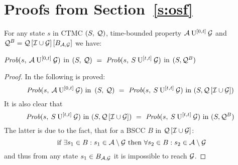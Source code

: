 \documentclass{entcs}
\newcommand{\Section}[1]{\section{#1}}
\begin{document}
	\Section{ Proofs from Section~\ref{s:osf} \label{app:osf}}

		\begin{proposition}
		For any state $s$ in CTMC $\left( S,\: \mathcal{Q} \right)$, time-bounded property $\mathcal{A} \: \mathrm{U}^{[0,t]} \: \mathcal{G}$ and $\mathcal{Q}^{B} = \mathcal{Q}\left[ \mathcal{I} \cup \mathcal{G} \right] \left[ B_{ \mathcal{A}, \mathcal{G} } \right]$ we have:
			\begin{center}
				$\mbox{\it Prob}(s, \: \mathcal{A} \: \mathrm{U}^{[0,t]} \: \mathcal{G} )$ in $\left( S,\: \mathcal{Q} \right) \ = \ \mbox{\it Prob}(s, \: S \: \mathrm{U}^{[t,t]} \: \mathcal{G} )$ in $(S,\mathcal{Q}^{B})$
			\end{center}
		\end{proposition}
		{\small
			\begin{proof}
				In \cite{BaierHHK_TSE03} the following is proved:
					\[
						\PsaUg{s}{0}{t}\text{ in }\CTMC \ = \ \PsSUg{s}{t}{t}\text{ in }(S,\mQnavg)
					\]
				It is also clear that
					\[
						\PsSUg{s}{t}{t}\text{ in }(S,\mQnavg) \ = \ \PsSUg{s}{t}{t}\text{ in }(S,\mQB)
					\]
				The latter is due to the fact, that for a BSCC $B$ in $\mathcal{Q}\left[ \mathcal{I} \cup \mathcal{G} \right]$:
					\[
						\text{ if } \exists s_{1} \in B : s_{1} \in \mathcal{A} \setminus \mathcal{G} \text{ then } \forall s_{2} \in B : s_{2} \in \mathcal{A} \setminus \mathcal{G}
					\]
				and thus from any state $s_{1} \in B_{ \mathcal{A}, \mathcal{G} }$ it is impossible to reach $\mathcal{G}$.
			\end{proof}
		}
\end{document}
